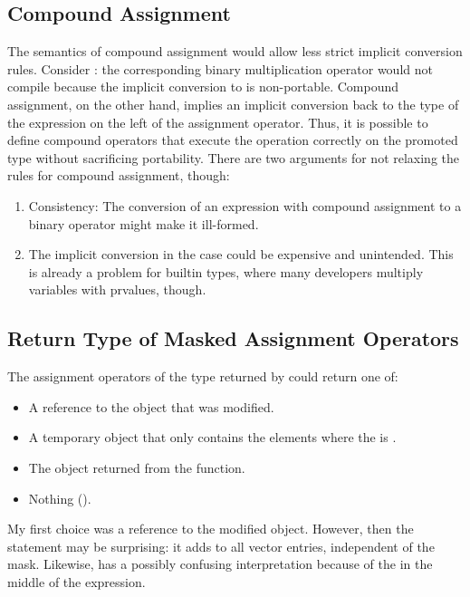 \subsection{Compound Assignment}
The semantics of compound assignment would allow less strict implicit conversion rules.
Consider : the corresponding binary multiplication operator would not compile because the implicit conversion to \datapar[<double>] is non-portable.
Compound assignment, on the other hand, implies an implicit conversion back to the type of the expression on the left of the assignment operator.
Thus, it is possible to define compound operators that execute the operation correctly on the promoted type without sacrificing portability.
There are two arguments for not relaxing the rules for compound assignment, though:
\begin{enumerate}
  \item Consistency: The conversion of an expression with compound assignment to a binary operator might make it ill-formed.
  \item The implicit conversion in the  case could be expensive and unintended.
    This is already a problem for builtin types, where many developers multiply \float variables with \double prvalues, though.
\end{enumerate}

\subsection{Return Type of Masked Assignment Operators}
The assignment operators of the type returned by  could return one of:
\begin{itemize}
  \item A reference to the \datapar object that was modified.
  \item A temporary \datapar object that only contains the elements where the \mask is \true.
  \item The object returned from the  function.
  \item Nothing (\ie \void).
\end{itemize}
My first choice was a reference to the modified \datapar object.
However, then the statement  may be surprising: it adds  to all vector entries, independent of the mask.
Likewise,  has a possibly confusing interpretation because of the \mask in the middle of the expression.

